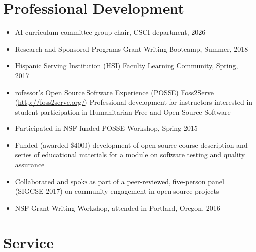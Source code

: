 \documentclass[10pt,letterpaper]{article}
\begin{document}
{\begin{itemize}[leftmargin=1.25em]
\end{itemize}
\section*{Professional Development}
\begin{itemize}[leftmargin=1.5em]
    \item AI curriculum committee group chair, CSCI department, 2026
    \item Research and Sponsored Programs Grant Writing Bootcamp, Summer, 2018
    \item Hispanic Serving Institution (HSI) Faculty Learning Community, Spring, 2017
    \item rofessor's Open Source Software Experience (POSSE) Foss2Serve (\url{http://foss2serve.org/}) Professional development for instructors interested in student participation in Humanitarian Free and Open Source Software
    \item Participated in NSF-funded POSSE Workshop, Spring 2015
    \item Funded (awarded \$4000) development of open source course description and series of educational materials for a module on software testing and quality assurance
    \item Collaborated and spoke as part of a peer-reviewed, five-person panel (SIGCSE 2017) on community engagement in open source projects
    \item NSF Grant Writing Workshop, attended in Portland, Oregon, 2016
\end{itemize}

\section*{Service}
}
\end{document}
